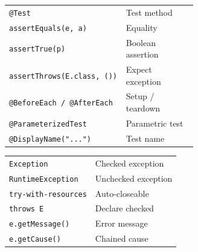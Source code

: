 \documentclass[10pt]{extarticle}
\begin{document}
\begin{multicols}{2}
\begin{tabularx}{\linewidth}{@{}>{\raggedright\arraybackslash}p{0.62\linewidth}@{\enspace}Y@{}}
\texttt{@Test}                       & Test method \\
\texttt{assertEquals(e, a)}         & Equality \\
\texttt{assertTrue(p)}              & Boolean assertion \\
\texttt{assertThrows(E.class, ())} & Expect exception \\
\texttt{@BeforeEach / @AfterEach}   & Setup / teardown \\
\texttt{@ParameterizedTest}          & Parametric test \\
\texttt{@DisplayName("...")}        & Test name \\
\end{tabularx}

\begin{tabularx}{\linewidth}{@{}l@{\enspace}Y@{}}
\texttt{Exception}                   & Checked exception \\
\texttt{RuntimeException}            & Unchecked exception \\
\texttt{try-with-resources}          & Auto-closeable \\
\texttt{throws E}                    & Declare checked \\
\texttt{e.getMessage()}              & Error message \\
\texttt{e.getCause()}                & Chained cause \\
\end{tabularx}

\end{multicols}

\newpage

\end{document}
